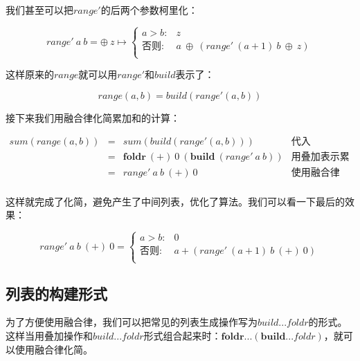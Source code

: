 \documentclass[b5paper]{ctexart}
\begin{document}
我们甚至可以把$range'$的后两个参数柯里化：

\[
range'\ a\ b = \oplus\ z \mapsto
  \begin{cases}
  a > b: & z \\
  \text{否则}: & a\ \oplus\ (range'\ (a+1)\ b\ \oplus\ z) \\
  \end{cases}
\]

这样原来的$range$就可以用$range'$和$build$表示了：

\[
range(a, b) = build(range'(a, b))
\]

接下来我们用融合律化简累加和的计算：

\[
\begin{array}{rcll}
sum(range(a, b)) & = & sum(build(range'(a, b))) & \text{代入} \\
  & = & \pmb{foldr}\ (+)\ 0\ (\pmb{build}\ (range'\ a\ b)) & \text{用叠加表示累加} \\
  & = & range'\ a\ b\ (+)\ 0 & \text{使用融合律} \\
\end{array}
\]

这样就完成了化简，避免产生了中间列表，优化了算法。我们可以看一下最后的效果：

\[
range'\ a\ b\ (+)\ 0 =
  \begin{cases}
  a > b: & 0 \\
  \text{否则}: & a + (range'\ (a+1)\ b\ (+)\ 0) \\
  \end{cases}
\]

\subsection{列表的构建形式}

为了方便使用融合律，我们可以把常见的列表生成操作写为$build...foldr$的形式。这样当用叠加操作和$build...foldr$形式组合起来时：$\pmb{foldr}...(\pmb{build}...foldr)$，就可以使用融合律化简。
\end{document}
